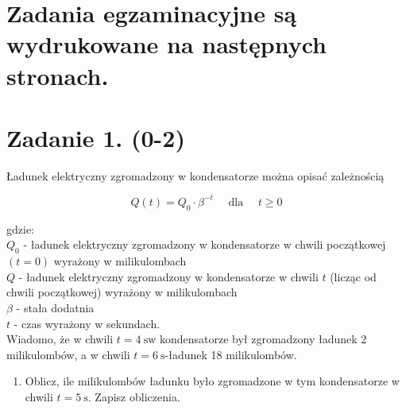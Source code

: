 \documentclass[10pt]{article}
\begin{document}
\section*{Zadania egzaminacyjne są wydrukowane na następnych stronach.}
\section*{Zadanie 1. (0-2)}
Ładunek elektryczny zgromadzony w kondensatorze można opisać zależnością

\[
Q(t)=Q_{0} \cdot \beta^{-t} \quad \text { dla } \quad t \geq 0
\]

gdzie:\\
\(Q_{0}\) - ładunek elektryczny zgromadzony w kondensatorze w chwili początkowej \((t=0)\) wyrażony w milikulombach\\
\(Q\) - ładunek elektryczny zgromadzony w kondensatorze w chwili \(t\) (licząc od chwili początkowej) wyrażony w milikulombach\\
\(\beta\) - stała dodatnia\\
\(t\) - czas wyrażony w sekundach.\\
Wiadomo, że w chwili \(t=4 \mathrm{~s} \mathrm{w}\) kondensatorze był zgromadzony ładunek 2 milikulombów, a w chwili \(t=6 \mathrm{~s}\)-ładunek 18 milikulombów.

\begin{enumerate}
  \item Oblicz, ile milikulombów ładunku było zgromadzone w tym kondensatorze w chwili \(t=5 \mathrm{~s}\). Zapisz obliczenia.
\end{enumerate}
\end{document}
